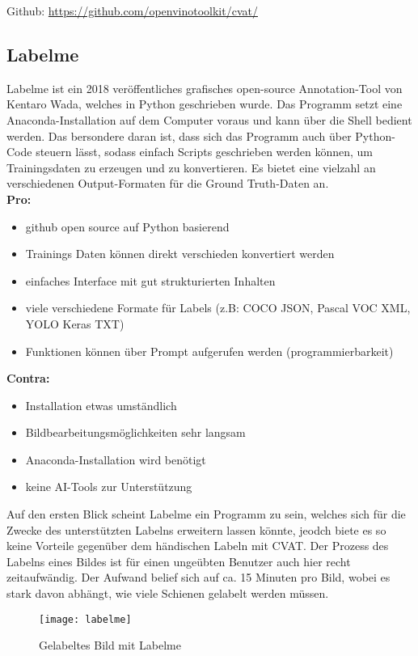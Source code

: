\documentclass[11pt]{scrartcl}
\begin{document}
\noindent 
Github: \url{https://github.com/openvinotoolkit/cvat/} 

\subsection{Labelme}
\label{sec:Labelme}

Labelme ist ein 2018 veröffentliches grafisches open-source Annotation-Tool von Kentaro Wada, welches in Python geschrieben wurde. Das Programm setzt eine Anaconda-Installation auf dem Computer voraus und kann über die Shell bedient werden. Das bersondere daran ist, dass sich das Programm auch über Python-Code steuern lässt, sodass einfach Scripts geschrieben werden können, um Trainingsdaten zu erzeugen und zu konvertieren. Es bietet eine vielzahl an verschiedenen Output-Formaten für die Ground Truth-Daten an.
\\

\textbf{Pro:} 
\begin{itemize}
	\item github open source auf Python basierend
	\item Trainings Daten können direkt verschieden konvertiert werden
	\item einfaches Interface mit gut strukturierten Inhalten
	\item viele verschiedene Formate für Labels (z.B: COCO JSON, Pascal VOC XML, YOLO Keras TXT)
	\item Funktionen können über Prompt aufgerufen werden (programmierbarkeit)
\end{itemize}
\textbf{Contra:} 
\begin{itemize}
	\item Installation etwas umständlich
	\item Bildbearbeitungsmöglichkeiten sehr langsam
	\item Anaconda-Installation wird benötigt
	\item keine AI-Tools zur Unterstützung
\end{itemize}
\noindent
Auf den ersten Blick scheint Labelme ein Programm zu sein, welches sich für die Zwecke des unterstützten Labelns erweitern lassen könnte, jeodch biete es so keine Vorteile gegenüber dem händischen Labeln mit CVAT. Der Prozess des Labelns eines Bildes ist für einen ungeübten Benutzer auch hier recht zeitaufwändig. 
Der Aufwand belief sich auf ca. 15 Minuten pro Bild, wobei es stark davon abhängt, wie viele Schienen gelabelt werden müssen. 
\begin{figure}[H]
  \texttt{[image: labelme]}
  \caption{Gelabeltes Bild mit Labelme}
\end{figure}
\end{document}
